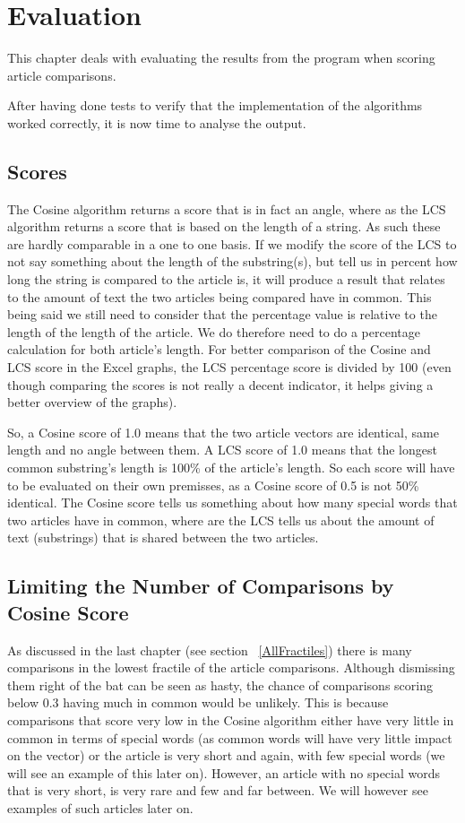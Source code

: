\chapter{Evaluation}
This chapter deals with evaluating the results from the program when scoring article comparisons.

After having done tests to verify that the implementation of the algorithms worked correctly, it is now time to analyse the output.

\section{Scores}

The Cosine algorithm returns a score that is in fact an angle, where as the LCS algorithm returns a score that is based on the length of a string. As such these are hardly comparable in a one to one basis. If we modify the score of the LCS to not say something about the length of the substring(s), but tell us in percent how long the string is compared to the article is, it will produce a result that relates to the amount of text the two articles being compared have in common. This being said we still need to consider that the percentage value is relative to the length of the length of the article. We do therefore need to do a percentage calculation for both article's length. For better comparison of the Cosine and LCS score in the Excel graphs, the LCS percentage score is divided by 100 (even though comparing the scores is not really a decent indicator, it helps giving a better overview of the graphs).

So, a Cosine score of 1.0 means that the two article vectors are identical, same length and no angle between them. A LCS score of 1.0 means that the longest common substring's length is 100\% of the article's length. So each score will have to be evaluated on their own premisses, as a Cosine score of 0.5 is not 50\% identical. The Cosine score tells us something about how many special words that two articles have in common, where are the LCS tells us about the amount of text (substrings) that is shared between the two articles.

\section{Limiting the Number of Comparisons by Cosine Score}

As discussed in the last chapter (see section ~\ref{AllFractiles}) there is many comparisons in the lowest fractile of the article comparisons. Although dismissing them right of the bat can be seen as hasty, the chance of comparisons scoring below 0.3 having much in common would be unlikely. This is because comparisons that score very low in the Cosine algorithm either have very little in common in terms of special words (as common words will have very little impact on the vector) or the article is very short and again, with few special words (we will see an example of this later on). However, an article with no special words that is very short, is very rare and few and far between. We will however see examples of such articles later on.

